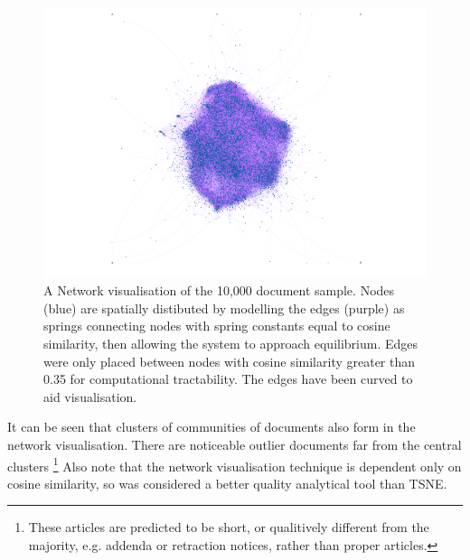 \begin{center}
\begin{figure}[H]
\label{fig:gephi_exp}
  \centering
    \includegraphics[scale=0.5]{Validation/sample.pdf}
    \caption{A Network visualisation of the 10,000 document sample. Nodes (blue) are spatially distibuted by modelling the edges (purple) as springs connecting nodes with spring constants equal to cosine similarity, then allowing the system to approach equilibrium. Edges were only placed between nodes with cosine similarity greater than 0.35 for computational tractability. The edges have been curved to aid visualisation.}
\end{figure} 
\end{center}
It can be seen that clusters of communities of documents also form in the network visualisation. There are noticeable outlier documents far from the central clusters \footnote{These articles are predicted to be short, or qualitively different from the majority, e.g. addenda or retraction notices, rather than proper articles.} Also note that the network visualisation technique is dependent only on cosine similarity, so was considered a better quality analytical tool than TSNE.